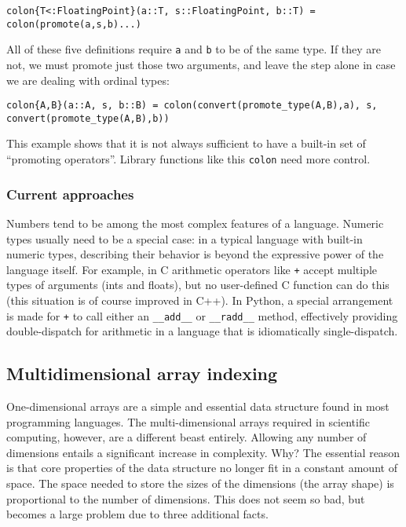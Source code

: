 \begin{verbatim}
colon{T<:FloatingPoint}(a::T, s::FloatingPoint, b::T) = colon(promote(a,s,b)...)
\end{verbatim}

All of these five definitions require \texttt{a} and \texttt{b} to be of the
same type. If they are not, we must promote just those two arguments, and leave
the step alone in case we are dealing with ordinal types:

\begin{verbatim}
colon{A,B}(a::A, s, b::B) = colon(convert(promote_type(A,B),a), s, convert(promote_type(A,B),b))
\end{verbatim}

This example shows that it is not always sufficient to have a built-in set of
``promoting operators''. Library functions like this \texttt{colon} need more
control.


\subsubsection{Current approaches}

Numbers tend to be among the most
complex features of a language. Numeric types usually need to be a special
case: in a typical language with built-in numeric types, describing their
behavior is beyond the expressive power of the language itself. For example,
in C arithmetic operators like \texttt{+} accept multiple types of arguments
(ints and floats), but no user-defined C function can do this (this situation
is of course improved in C++). In Python, a special arrangement is made for
\texttt{+} to call either an \texttt{\_\_add\_\_} or \texttt{\_\_radd\_\_} method,
effectively providing double-dispatch for arithmetic in a language that is
idiomatically single-dispatch.



\subsection{Multidimensional array indexing}

One-dimensional arrays are a simple and essential data structure found in
most programming languages. The multi-dimensional arrays required in
scientific computing, however, are a different beast entirely. Allowing
any number of dimensions entails a significant increase in complexity. Why?
The essential reason is that core properties of the data structure no
longer fit in a constant amount of space. The space needed to store the
sizes of the dimensions (the array shape) is proportional to the number
of dimensions. This does not seem so bad, but becomes a large problem
due to three additional facts.

